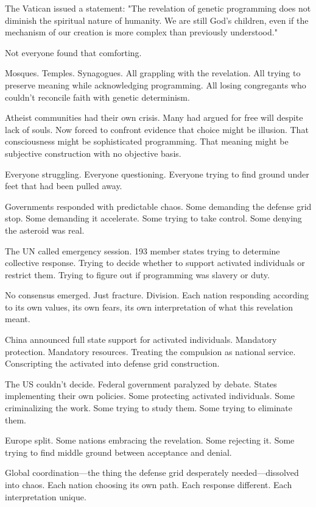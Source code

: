 The Vatican issued a statement: "The revelation of genetic programming does not diminish the spiritual nature of humanity. We are still God's children, even if the mechanism of our creation is more complex than previously understood."

Not everyone found that comforting.

Mosques. Temples. Synagogues. All grappling with the revelation. All trying to preserve meaning while acknowledging programming. All losing congregants who couldn't reconcile faith with genetic determinism.

Atheist communities had their own crisis. Many had argued for free will despite lack of souls. Now forced to confront evidence that choice might be illusion. That consciousness might be sophisticated programming. That meaning might be subjective construction with no objective basis.

Everyone struggling. Everyone questioning. Everyone trying to find ground under feet that had been pulled away.

\scenebreak

Governments responded with predictable chaos. Some demanding the defense grid stop. Some demanding it accelerate. Some trying to take control. Some denying the asteroid was real.

The UN called emergency session. 193 member states trying to determine collective response. Trying to decide whether to support activated individuals or restrict them. Trying to figure out if programming was slavery or duty.

No consensus emerged. Just fracture. Division. Each nation responding according to its own values, its own fears, its own interpretation of what this revelation meant.

China announced full state support for activated individuals. Mandatory protection. Mandatory resources. Treating the compulsion as national service. Conscripting the activated into defense grid construction.

The US couldn't decide. Federal government paralyzed by debate. States implementing their own policies. Some protecting activated individuals. Some criminalizing the work. Some trying to study them. Some trying to eliminate them.

Europe split. Some nations embracing the revelation. Some rejecting it. Some trying to find middle ground between acceptance and denial.

Global coordination—the thing the defense grid desperately needed—dissolved into chaos. Each nation choosing its own path. Each response different. Each interpretation unique.

